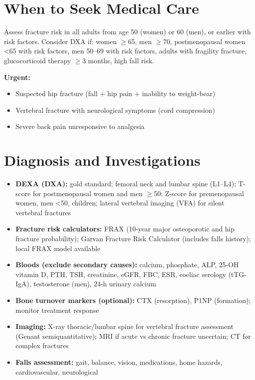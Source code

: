 \section*{When to Seek Medical Care}
Assess fracture risk in all adults from age 50 (women) or 60 (men), or earlier with risk factors. Consider DXA if: women $\ge$65, men $\ge$70, postmenopausal women <65 with risk factors, men 50--69 with risk factors, adults with fragility fracture, glucocorticoid therapy $\ge$3 months, high fall risk.

\textbf{Urgent:}
\begin{itemize}
    \item Suspected hip fracture (fall + hip pain + inability to weight-bear)
    \item Vertebral fracture with neurological symptoms (cord compression)
    \item Severe back pain unresponsive to analgesia
\end{itemize}

\section*{Diagnosis and Investigations}
\begin{itemize}
    \item \textbf{DEXA (DXA):} gold standard; femoral neck and lumbar spine (L1--L4); T-score for postmenopausal women and men $\ge$50; Z-score for premenopausal women, men <50, children; lateral vertebral imaging (VFA) for silent vertebral fractures
    \item \textbf{Fracture risk calculators:} FRAX (10-year major osteoporotic and hip fracture probability); Garvan Fracture Risk Calculator (includes falls history); local FRAX model available
    \item \textbf{Bloods (exclude secondary causes):} calcium, phosphate, ALP, 25-OH vitamin D, PTH, TSH, creatinine, eGFR, FBC, ESR, coeliac serology (tTG-IgA), testosterone (men), 24-h urinary calcium
    \item \textbf{Bone turnover markers (optional):} CTX (resorption), P1NP (formation); monitor treatment response
    \item \textbf{Imaging:} X-ray thoracic/lumbar spine for vertebral fracture assessment (Genant semiquantitative); MRI if acute vs chronic fracture uncertain; CT for complex fractures
    \item \textbf{Falls assessment:} gait, balance, vision, medications, home hazards, cardiovascular, neurological
\end{itemize}

